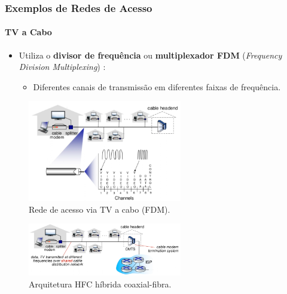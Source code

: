     \subsubsection*{Exemplos de Redes de Acesso}

    \paragraph{TV a Cabo}
    \begin{itemize}[left=0.5cm, align=left, nosep]
        \item Utiliza o \textbf{divisor de frequência} ou \textbf{multiplexador FDM} (\textit{Frequency Division Multiplexing}) : \\ 
        \begin{itemize}[left=0.5cm, nosep, label=$\hookrightarrow$]
            \item Diferentes canais de transmissão em diferentes faixas de frequência.
        \end{itemize}    
    \end{itemize}

    \begin{figure}[H]
        \centering
        \includegraphics[width=0.6\textwidth]{img/cap-01/tv-a-cabo.png}
        \caption{Rede de acesso via TV a cabo (FDM).}
    \end{figure}

    \begin{figure}[H]
        \centering
        \includegraphics[width=0.6\textwidth]{img/cap-01/tv-a-cabo2.png}
        \caption{Arquitetura HFC híbrida coaxial-fibra.}
    \end{figure}
    
